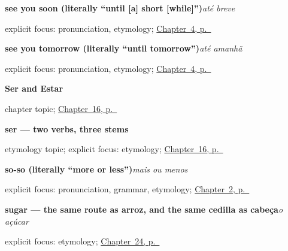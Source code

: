 \noindent\begin{minipage}[t]{\linewidth}
\raggedright
\textbf{see you soon (literally \textquotedblleft{}until {[}a{]} short {[}while{]}\textquotedblright{})}\enspace\emph{até breve}\par
\footnotesize explicit focus: pronunciation, etymology; \hyperref[ch:pt-farewells]{Chapter~4, p.~\pageref*{ch:pt-farewells}}
\end{minipage}\par\smallskip

\noindent\begin{minipage}[t]{\linewidth}
\raggedright
\textbf{see you tomorrow (literally \textquotedblleft{}until tomorrow\textquotedblright{})}\enspace\emph{até amanhã}\par
\footnotesize explicit focus: pronunciation, etymology; \hyperref[ch:pt-farewells]{Chapter~4, p.~\pageref*{ch:pt-farewells}}
\end{minipage}\par\smallskip

\noindent\begin{minipage}[t]{\linewidth}
\raggedright
\textbf{Ser and Estar}\par
\footnotesize chapter topic; \hyperref[ch:pt-ser-and-estar]{Chapter~16, p.~\pageref*{ch:pt-ser-and-estar}}
\end{minipage}\par\smallskip

\noindent\begin{minipage}[t]{\linewidth}
\raggedright
\textbf{ser — two verbs, three stems}\par
\footnotesize etymology topic; explicit focus: etymology; \hyperref[ch:pt-ser-and-estar]{Chapter~16, p.~\pageref*{ch:pt-ser-and-estar}}
\end{minipage}\par\smallskip

\noindent\begin{minipage}[t]{\linewidth}
\raggedright
\textbf{so-so (literally \textquotedblleft{}more or less\textquotedblright{})}\enspace\emph{mais ou menos}\par
\footnotesize explicit focus: pronunciation, grammar, etymology; \hyperref[ch:pt-how-are-you]{Chapter~2, p.~\pageref*{ch:pt-how-are-you}}
\end{minipage}\par\smallskip

\noindent\begin{minipage}[t]{\linewidth}
\raggedright
\textbf{sugar — the same route as arroz, and the same cedilla as cabeça}\enspace\emph{o açúcar}\par
\footnotesize explicit focus: etymology; \hyperref[ch:pt-cheese-egg-rice-sugar]{Chapter~24, p.~\pageref*{ch:pt-cheese-egg-rice-sugar}}
\end{minipage}\par\smallskip

